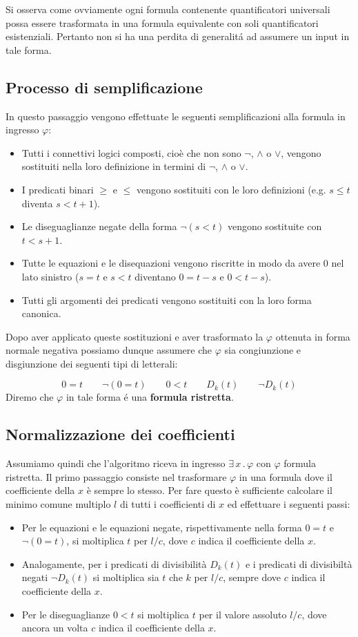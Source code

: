 \documentclass[11pt,letterpaper,twoside]{article}
\begin{document}
Si osserva come ovviamente ogni formula contenente quantificatori universali
possa essere trasformata in una formula equivalente con soli quantificatori
esistenziali.
Pertanto non si ha una perdita di generalit\'a ad assumere un input in tale
forma.

\subsection{Processo di semplificazione}
In questo passaggio vengono effettuate le seguenti semplificazioni alla formula
in ingresso $\varphi$:
\begin{itemize}
\item Tutti i connettivi logici composti, cio\`e che non sono $\lnot$, $\land$ o
  $\lor$, vengono sostituiti nella loro definizione in termini di $\lnot$,
  $\land$ o $\lor$.
\item I predicati binari $\ge$ e $\le$ vengono sostituiti con le loro
  definizioni (e.g. $s \le t$ diventa $s < t + 1$). 
\item Le diseguaglianze negate della forma $\lnot (s < t)$ vengono sostituite
  con $t < s + 1$.
\item Tutte le equazioni e le disequazioni vengono riscritte in modo da avere
  $0$ nel lato sinistro ($s=t$ e $s<t$ diventano $0=t-s$ e $0<t-s$).
\item Tutti gli argomenti dei predicati vengono sostituiti con la loro forma
  canonica.
\end{itemize}
Dopo aver applicato queste sostituzioni e aver trasformato la $\varphi$ ottenuta
in forma normale negativa possiamo dunque assumere che $\varphi$ sia
congiunzione e disgiunzione dei seguenti tipi di letterali:

$$0=t \qquad \lnot(0=t) \qquad 0<t \qquad D_k(t) \qquad \lnot D_k(t)$$
Diremo che $\varphi$ in tale forma \'e una \textbf{formula ristretta}.

\subsection{Normalizzazione dei coefficienti}
Assumiamo quindi che l'algoritmo riceva in ingresso $\exists \, x \, . \,
\varphi$ con $\varphi$ formula ristretta. Il primo passaggio consiste nel
trasformare $\varphi$ in una formula dove il coefficiente della $x$ \`e sempre
lo stesso. Per fare questo \`e sufficiente calcolare il minimo comune multiplo
$l$ di tutti i coefficienti di $x$ ed effettuare i seguenti passi:
\begin{itemize}
  \item Per le equazioni e le equazioni negate, rispettivamente nella forma
    $0=t$ e $\lnot (0=t)$, si moltiplica $t$  per $l/c$, dove $c$ indica il
    coefficiente della $x$.
  \item Analogamente, per i predicati di divisibilit\`a $D_k(t)$ e i predicati
    di divisibilt\`a negati $\lnot D_k(t)$ si moltiplica sia $t$ che $k$ per
    $l/c$, sempre dove $c$ indica il coefficiente della $x$.
  \item Per le diseguaglianze $0<t$ si moltiplica $t$ per il valore assoluto
    $l/c$, dove ancora un volta $c$ indica il coefficiente della $x$.
  \end{itemize}
\end{document}
